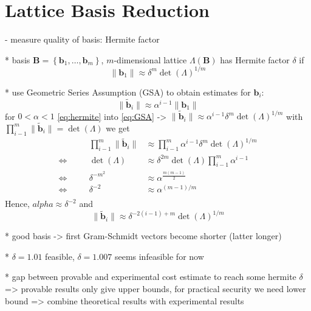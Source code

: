 
\section{Lattice Basis Reduction} %
- measure quality of basis: Hermite factor  %

  * basis $\textbf{B} = \left\{\textbf{b}_1, \ldots, \textbf{b}_m\right\}$, $m$-dimensional lattice $\Lambda(\textbf{B})$ has Hermite factor $\delta$ if
  \begin{equation} \label{eq:hermite}
    \| \textbf{b}_1 \| \approx \delta^m \det(\Lambda)^{1/m}
  \end{equation}

  * use Geometric Series Assumption (GSA) to obtain estimates for $\textbf{b}_i$: %
    \begin{equation} \label{eq:GSA}
      \| \tilde{\textbf{b}}_i \| \approx \alpha^{i-1} \| \textbf{b}_1 \|
    \end{equation}
    for $0 < \alpha < 1$
    \cref{eq:hermite} into \cref{eq:GSA} -> $\| \tilde{\textbf{b}}_i \| \approx \alpha^{i-1} \delta^m \det(\Lambda)^{1/m}$
    with $\prod_{i-1}^m \| \tilde{\textbf{b}}_i \| = \det(\Lambda)$ we get 
    \begin{align*}
      &\quad& \prod_{i-1}^m \| \tilde{\textbf{b}}_i \| &\approx \prod_{i-1}^m \alpha^{i-1} \delta^m \det(\Lambda)^{1/m} \\
      \Leftrightarrow&\quad& \det(\Lambda) &\approx \delta^{2m} \det(\Lambda) \prod_{i-1}^m \alpha^{i-1}\\
      \Leftrightarrow&\quad& \delta^{-m^2}  &\approx \alpha^{\frac{m(m-1)}{2}}\\
      \Leftrightarrow&\quad& \delta^{-2}  &\approx \alpha^{(m-1)/m}\\
    \end{align*}
    Hence, $alpha \approx \delta^{-2}$ and 
    \begin{equation}
      \| \tilde{\textbf{b}}_i \| \approx \delta^{-2(i-1) + m} \det(\Lambda)^{1/m}
    \end{equation}

  * good basis -> first Gram-Schmidt vectors become shorter (latter longer)

  * $\delta = 1.01$ feasible, $\delta = 1.007$ seems infeasible for now

  * gap between provable and experimental cost estimate to reach some hermite $\delta$ => provable results only give upper bounds, for practical security we need lower bound => combine theoretical results with experimental results

